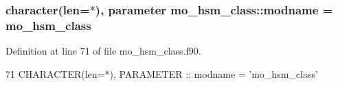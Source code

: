 \subsubsection[{modname}]{\setlength{\rightskip}{0pt plus 5cm}character(len=$\ast$), parameter mo\+\_\+hsm\+\_\+class\+::modname = \textquotesingle{}mo\+\_\+hsm\+\_\+class\textquotesingle{}}\label{namespacemo__hsm__class_a0c94990aceda682db1c3282ff2d8c836}


Definition at line 71 of file mo\+\_\+hsm\+\_\+class.\+f90.


\begin{DoxyCode}
71   \textcolor{keywordtype}{CHARACTER(len=*)}, \textcolor{keywordtype}{PARAMETER} :: modname = \textcolor{stringliteral}{'mo\_hsm\_class'}
\end{DoxyCode}

